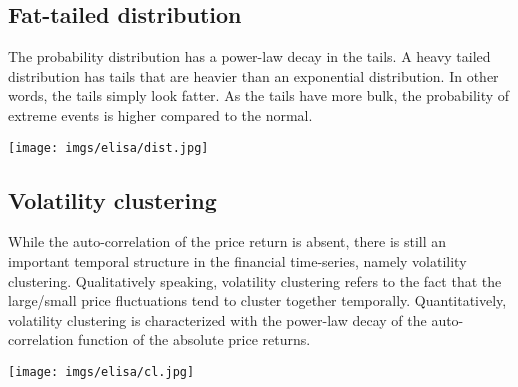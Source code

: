 \documentclass{article}
\begin{document}
    \subsection*{Fat-tailed distribution}
    The probability distribution has a power-law decay in the tails. A heavy tailed distribution has tails that are heavier than an exponential distribution.  In other words, the tails simply look fatter. As the tails have more bulk, the probability of extreme events is higher compared to the normal. 
    \begin{center}
        \texttt{[image: imgs/elisa/dist.jpg]} 
    \end{center}
    

    \subsection*{Volatility clustering}
    While the auto-correlation of the price return is absent, there is still an important temporal structure in the financial time-series, namely volatility clustering. Qualitatively speaking, volatility clustering refers to the fact that the large/small price fluctuations tend to cluster together temporally. Quantitatively, volatility clustering is characterized with the power-law decay of the auto-correlation function of the absolute price returns. 
    \begin{center}
        \texttt{[image: imgs/elisa/cl.jpg]} 
    \end{center}


    
\end{document}
